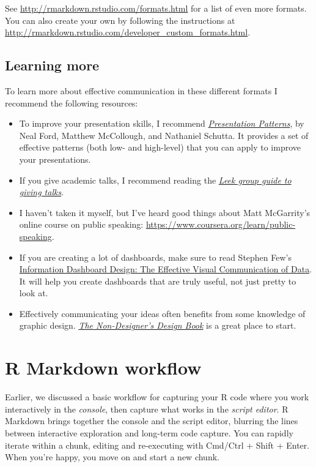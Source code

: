 \documentclass[]{book}
\begin{document}
See \url{http://rmarkdown.rstudio.com/formats.html} for a list of even
more formats. You can also create your own by following the instructions
at \url{http://rmarkdown.rstudio.com/developer_custom_formats.html}.

\section{Learning more}\label{learning-more-4}

To learn more about effective communication in these different formats I
recommend the following resources:

\begin{itemize}
\item
  To improve your presentation skills, I recommend
  \href{https://amzn.com/0321820800}{\emph{Presentation Patterns}}, by
  Neal Ford, Matthew McCollough, and Nathaniel Schutta. It provides a
  set of effective patterns (both low- and high-level) that you can
  apply to improve your presentations.
\item
  If you give academic talks, I recommend reading the
  \href{https://github.com/jtleek/talkguide}{\emph{Leek group guide to
  giving talks}}.
\item
  I haven't taken it myself, but I've heard good things about Matt
  McGarrity's online course on public speaking:
  \url{https://www.coursera.org/learn/public-speaking}.
\item
  If you are creating a lot of dashboards, make sure to read Stephen
  Few's \href{https://amzn.com/0596100167}{Information Dashboard Design:
  The Effective Visual Communication of Data}. It will help you create
  dashboards that are truly useful, not just pretty to look at.
\item
  Effectively communicating your ideas often benefits from some
  knowledge of graphic design.
  \href{http://amzn.com/0133966151}{\emph{The Non-Designer's Design
  Book}} is a great place to start.
\end{itemize}

\hypertarget{r-markdown-workflow}{\chapter{R Markdown
workflow}\label{r-markdown-workflow}}

Earlier, we discussed a basic workflow for capturing your R code where
you work interactively in the \emph{console}, then capture what works in
the \emph{script editor}. R Markdown brings together the console and the
script editor, blurring the lines between interactive exploration and
long-term code capture. You can rapidly iterate within a chunk, editing
and re-executing with Cmd/Ctrl + Shift + Enter. When you're happy, you
move on and start a new chunk.
\end{document}
